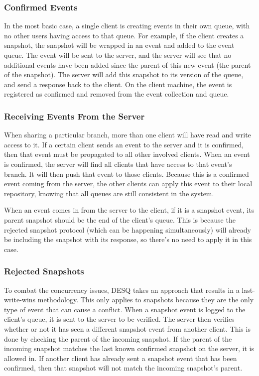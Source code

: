 \subsubsection{Confirmed Events}

In the most basic case, a single client is creating events in their own queue, with no other users having access to that queue. For example, if the client creates a snapshot, the snapshot will be wrapped in an event and added to the event queue. The event will be sent to the server, and the server will see that no additional events have been added since the parent of this new event (the parent of the snapshot). The server will add this snapshot to its version of the queue, and send a response back to the client. On the client machine, the event is registered as confirmed and removed from the event collection and queue.

\subsubsection{Receiving Events From the Server}

When sharing a particular branch, more than one client will have read and write access to it. If a certain client sends an event to the server and it is confirmed, then that event must be propagated to all other involved clients. When an event is confirmed, the server will find all clients that have access to that event's branch. It will then push that event to those clients. Because this is a confirmed event coming from the server, the other clients can apply this event to their local repository, knowing that all queues are still consistent in the system.

When an event comes in from the server to the client, if it is a snapshot event, its parent snapshot should be the end of the client's queue. This is because the rejected snapshot protocol (which can be happening simultaneously) will already be including the snapshot with its response, so there's no need to apply it in this case. 

\subsubsection{Rejected Snapshots}

To combat the concurrency issues, DESQ takes an approach that results in a last-write-wins methodology. This only applies to snapshots because they are the only type of event that can cause a conflict. When a snapshot event is logged to the client's queue, it is sent to the server to be verified. The server then verifies whether or not it has seen a different snapshot event from another client. This is done by checking the parent of the incoming snapshot. If the parent of the incoming snapshot matches the last known confirmed snapshot on the server, it is allowed in. If another client has already sent a snapshot event that has been confirmed, then that snapshot will not match the incoming snapshot's parent.

